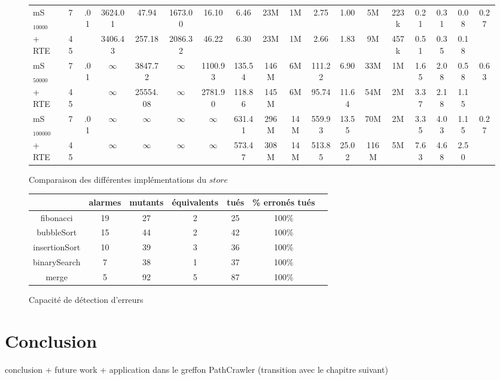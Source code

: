 \begin{landscape}
\begin{figure}[h]
\begin{tabular}{|l|c|c|c|c|c|c|c|c|c|c|c|c|c|c|c|c|c|}
    \hline
mS$_{10000}$ &7 &\multirow{2}{*}{.01} &3624.01 &47.94 &1673.00 &16.10 &6.46 &23M &1M &2.75 &1.00 &5M &223k &0.21 &0.31 &0.08 &\multirow{2}{*}{0.27}\\
+ RTE &45 &&3406.43 &257.18 &2086.32 &46.22 &6.30 &23M &1M &2.66 &1.83 &9M &457k &0.51 &0.35 &0.18 &\\
\hline
mS$_{50000}$ &7 &\multirow{2}{*}{.01} &$\infty$ &3847.72 &$\infty$ &1100.93 &135.54 &146M &6M &111.22 &6.90 &33M &1M &1.65 &2.08 &0.58 &\multirow{2}{*}{0.63}\\
+ RTE &45 &&$\infty$ &25554.08 &$\infty$ &2781.90 &118.86 &145M &6M &95.74 &11.64 &54M &2M &3.37 &2.18 &1.15 &\\
\hline
mS$_{100000}$ &7 &\multirow{2}{*}{.01} &$\infty$ &$\infty$ &$\infty$ &$\infty$ &631.41 &296M &14M &559.93 &13.55 &70M &2M &3.35 &4.03 &1.15 &\multirow{2}{*}{0.27}\\
+ RTE &45 &&$\infty$ &$\infty$ &$\infty$ &$\infty$ &573.47 &308M &14M &513.85 &25.02 &116M &5M &7.63 &4.68 &2.50 &\\
\hline
  \end{tabular}
  \caption{Comparaison des différentes implémentations du $store$}
\end{figure}
\label{fig:mmodel-exp}
\end{landscape}






\begin{figure}[t]
  \centering
  \begin{tabular}{|c|c|c|c|c|c|c|}
    \hline
    & alarmes & mutants & équivalents & tués & \% erronés tués \\
    \hline
    fibonacci & 19  & 27 & 2 & 25 & 100\% \\
    \hline
    bubbleSort & 15  & 44 & 2 & 42 & 100\% \\
    \hline
    insertionSort & 10  & 39 & 3 & 36 & 100\% \\
    \hline
    binarySearch & 7 & 38 & 1 & 37 & 100\% \\
    \hline
    merge & 5 & 92 & 5 & 87 & 100\% \\
    \hline
  \end{tabular}
  \vspace{-2mm}
  \caption{Capacité de détection d'erreurs}
  \vspace{-2mm}
  \label{fig:mutation-exp}
\end{figure}




\section{Conclusion}
conclusion + future work + application dans le greffon PathCrawler (transition
avec le chapitre suivant)

